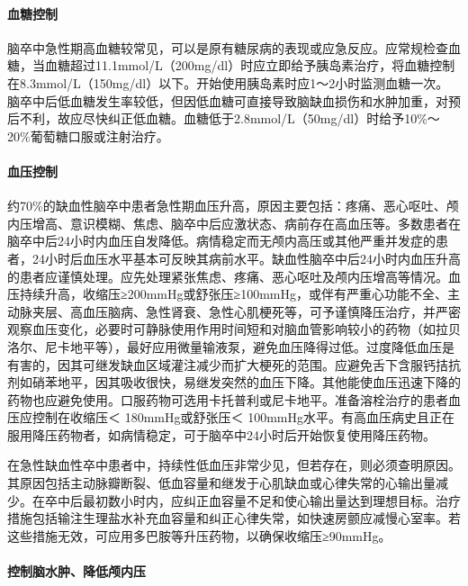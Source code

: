 \paragraph{血糖控制}

脑卒中急性期高血糖较常见，可以是原有糖尿病的表现或应急反应。应常规检查血糖，当血糖超过11.1mmol/L（200mg/dl）时应立即给予胰岛素治疗，将血糖控制在8.3mmol/L（150mg/dl）以下。开始使用胰岛素时应1～2小时监测血糖一次。脑卒中后低血糖发生率较低，但因低血糖可直接导致脑缺血损伤和水肿加重，对预后不利，故应尽快纠正低血糖。血糖低于2.8mmol/L（50mg/dl）时给予10\%～20\%葡萄糖口服或注射治疗。

\paragraph{血压控制}

约70\%的缺血性脑卒中患者急性期血压升高，原因主要包括：疼痛、恶心呕吐、颅内压增高、意识模糊、焦虑、脑卒中后应激状态、病前存在高血压等。多数患者在脑卒中后24小时内血压自发降低。病情稳定而无颅内高压或其他严重并发症的患者，24小时后血压水平基本可反映其病前水平。缺血性脑卒中后24小时内血压升高的患者应谨慎处理。应先处理紧张焦虑、疼痛、恶心呕吐及颅内压增高等情况。血压持续升高，收缩压≥200mmHg或舒张压≥100mmHg，或伴有严重心功能不全、主动脉夹层、高血压脑病、急性肾衰、急性心肌梗死等，可予谨慎降压治疗，并严密观察血压变化，必要时可静脉使用作用时间短和对脑血管影响较小的药物（如拉贝洛尔、尼卡地平等），最好应用微量输液泵，避免血压降得过低。过度降低血压是有害的，因其可继发缺血区域灌注减少而扩大梗死的范围。应避免舌下含服钙拮抗剂如硝苯地平，因其吸收很快，易继发突然的血压下降。其他能使血压迅速下降的药物也应避免使用。口服药物可选用卡托普利或尼卡地平。准备溶栓治疗的患者血压应控制在收缩压＜
180mmHg或舒张压＜
100mmHg水平。有高血压病史且正在服用降压药物者，如病情稳定，可于脑卒中24小时后开始恢复使用降压药物。

在急性缺血性卒中患者中，持续性低血压非常少见，但若存在，则必须查明原因。其原因包括主动脉瓣断裂、低血容量和继发于心肌缺血或心律失常的心输出量减少。在卒中后最初数小时内，应纠正血容量不足和使心输出量达到理想目标。治疗措施包括输注生理盐水补充血容量和纠正心律失常，如快速房颤应减慢心室率。若这些措施无效，可应用多巴胺等升压药物，以确保收缩压≥90mmHg。

\paragraph{控制脑水肿、降低颅内压}


